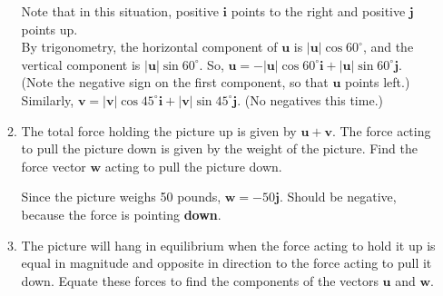 \documentclass[10pt]{article}
\newcommand{\vu}{\mathbf{u}}
\newcommand{\vv}{\mathbf{v}}
\newcommand{\vw}{\mathbf{w}}
\newcommand{\vi}{\mathbf{i}}
\newcommand{\vj}{\mathbf{j}}
\newenvironment{red}{\color{red}}{\ignorespacesafterend}
\begin{document}
\begin{enumerate}[leftmargin=0pt]
\begin{enumerate}
        \begin{red}
        Note that in this situation, positive $\vi$ points to the right and positive $\vj$ points up.\\
        By trigonometry, the horizontal component of $\vu$ is $|\vu|\cos60^\circ$, and the vertical component is $|\vu|\sin60^\circ$. So, $\vu = -|\vu|\cos60^\circ \vi + |\vu|\sin60^\circ \vj$. (Note the negative sign on the first component, so that $\vu$ points left.)\\
        Similarly, $\vv = |\vv|\cos45^\circ \vi + |\vv|\sin45^\circ \vj$. (No negatives this time.)
        \end{red}
        \item The total force holding the picture up is given by $\vu + \vv$. The force acting to pull the picture down is given by the weight of the picture. Find the force vector $\vw$ acting to pull the picture down.
        
        \begin{red}
        Since the picture weighs 50 pounds, $\vw = -50\vj$. Should be negative, because the force is pointing \textbf{down}.
        \end{red}
        \item The picture will hang in equilibrium when the force acting to hold it up is equal in magnitude and opposite in direction to the force acting to pull it down. Equate these forces to find the components of the vectors $\vu$ and $\vw$.
        

\end{enumerate}
\end{enumerate}
\end{document}
